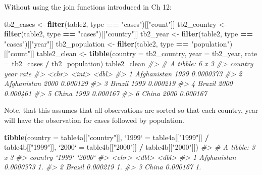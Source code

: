 \documentclass[]{book}
\newenvironment{Shaded}{\begin{snugshade}}{\end{snugshade}}
\newcommand{\CommentTok}[1]{\textcolor[rgb]{0.56,0.35,0.01}{\textit{#1}}}
\newcommand{\DataTypeTok}[1]{\textcolor[rgb]{0.13,0.29,0.53}{#1}}
\newcommand{\KeywordTok}[1]{\textcolor[rgb]{0.13,0.29,0.53}{\textbf{#1}}}
\newcommand{\NormalTok}[1]{#1}
\newcommand{\OperatorTok}[1]{\textcolor[rgb]{0.81,0.36,0.00}{\textbf{#1}}}
\newcommand{\StringTok}[1]{\textcolor[rgb]{0.31,0.60,0.02}{#1}}
\theoremstyle{definition}
\theoremstyle{definition}
\theoremstyle{definition}
\theoremstyle{remark}
\begin{document}
Without using the join functions introduced in Ch 12:

\begin{Shaded}
\begin{Highlighting}[]
\NormalTok{tb2_cases <-}\StringTok{ }\KeywordTok{filter}\NormalTok{(table2, type }\OperatorTok{==}\StringTok{ "cases"}\NormalTok{)[[}\StringTok{"count"}\NormalTok{]]}
\NormalTok{tb2_country <-}\StringTok{ }\KeywordTok{filter}\NormalTok{(table2, type }\OperatorTok{==}\StringTok{ "cases"}\NormalTok{)[[}\StringTok{"country"}\NormalTok{]]}
\NormalTok{tb2_year <-}\StringTok{ }\KeywordTok{filter}\NormalTok{(table2, type }\OperatorTok{==}\StringTok{ "cases"}\NormalTok{)[[}\StringTok{"year"}\NormalTok{]]}
\NormalTok{tb2_population <-}\StringTok{ }\KeywordTok{filter}\NormalTok{(table2, type }\OperatorTok{==}\StringTok{ "population"}\NormalTok{)[[}\StringTok{"count"}\NormalTok{]]}
\NormalTok{table2_clean <-}\StringTok{ }\KeywordTok{tibble}\NormalTok{(}\DataTypeTok{country =}\NormalTok{ tb2_country,}
       \DataTypeTok{year =}\NormalTok{ tb2_year,}
       \DataTypeTok{rate =}\NormalTok{ tb2_cases }\OperatorTok{/}\StringTok{ }\NormalTok{tb2_population)}
\NormalTok{table2_clean}
\CommentTok{#> # A tibble: 6 x 3}
\CommentTok{#>   country      year      rate}
\CommentTok{#>   <chr>       <int>     <dbl>}
\CommentTok{#> 1 Afghanistan  1999 0.0000373}
\CommentTok{#> 2 Afghanistan  2000 0.000129 }
\CommentTok{#> 3 Brazil       1999 0.000219 }
\CommentTok{#> 4 Brazil       2000 0.000461 }
\CommentTok{#> 5 China        1999 0.000167 }
\CommentTok{#> 6 China        2000 0.000167}
\end{Highlighting}
\end{Shaded}

Note, that this assumes that all observations are sorted so that each
country, year will have the observation for cases followed by
population.

\begin{Shaded}
\begin{Highlighting}[]
\KeywordTok{tibble}\NormalTok{(}\DataTypeTok{country =}\NormalTok{ table4a[[}\StringTok{"country"}\NormalTok{]],}
       \StringTok{`}\DataTypeTok{1999}\StringTok{`}\NormalTok{ =}\StringTok{ }\NormalTok{table4a[[}\StringTok{"1999"}\NormalTok{]] }\OperatorTok{/}\StringTok{ }\NormalTok{table4b[[}\StringTok{"1999"}\NormalTok{]],}
       \StringTok{`}\DataTypeTok{2000}\StringTok{`}\NormalTok{ =}\StringTok{ }\NormalTok{table4b[[}\StringTok{"2000"}\NormalTok{]] }\OperatorTok{/}\StringTok{ }\NormalTok{table4b[[}\StringTok{"2000"}\NormalTok{]])}
\CommentTok{#> # A tibble: 3 x 3}
\CommentTok{#>   country        `1999` `2000`}
\CommentTok{#>   <chr>           <dbl>  <dbl>}
\CommentTok{#> 1 Afghanistan 0.0000373     1.}
\CommentTok{#> 2 Brazil      0.000219      1.}
\CommentTok{#> 3 China       0.000167      1.}
\end{Highlighting}
\end{Shaded}
\end{document}
